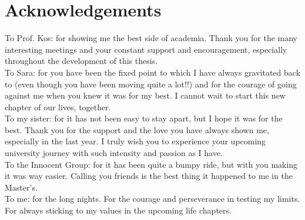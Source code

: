 \section*{Acknowledgements}
To Prof. Kos: for showing me the best side of academia. Thank you for the many interesting meetings and your constant support and encouragement, especially throughout the development of this thesis.
\\ 



To Sara: for you have been the fixed point to which I have always gravitated back to (even though you have been moving quite a lot!!) and for the courage of going against me when you knew it was for my best. I cannot wait to start this new chapter of our lives, together. 
\\



To my sister: for it has not been easy to stay apart, but I hope it was for the best. Thank you for the support and the love you have always shown me, especially in the last year. I truly wish you to experience your upcoming university journey with such intensity and passion as I have.
\\



To the Innocent Group: for it has been quite a bumpy ride, but with you making it was way easier. Calling you friends is the best thing it happened to me in the Master's. 
\\



To me: for the long nights. For the courage and perseverance in testing my limits. For always sticking to my values in the upcoming life chapters.
\\

